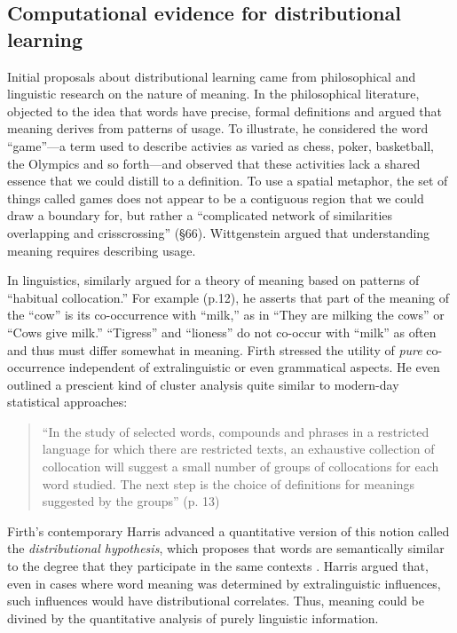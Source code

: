 \documentclass[man,longtable,floatsintext]{my-apa6}
\begin{document}
\subsection{Computational evidence for distributional learning}

Initial proposals about distributional learning came from philosophical and linguistic research on the nature of meaning. In the philosophical literature, \citet{wittgenstein1953} objected to the idea that words have precise, formal definitions and argued that meaning derives from patterns of usage. To illustrate, he considered the word ``game''---a term used to describe activies as varied as chess, poker, basketball, the Olympics and so forth---and observed that these activities lack a shared essence that we could distill to a definition. To use a spatial metaphor, the set of things called games does not appear to be a contiguous region that we could draw a boundary for, but rather a ``complicated network of similarities overlapping and crisscrossing'' (\S 66). Wittgenstein argued that understanding meaning requires describing usage.

In linguistics, \citet{firth1957} similarly argued for a theory of meaning based on patterns of ``habitual collocation.'' For example (p.12), he asserts that part of the meaning of the ``cow'' is its co-occurrence with  ``milk,'' as in ``They are milking the cows'' or ``Cows give milk.'' ``Tigress'' and ``lioness'' do not co-occur with ``milk'' as often and thus must differ somewhat in meaning. Firth stressed the utility of \emph{pure} co-occurrence independent of extralinguistic or even grammatical aspects. He even outlined a prescient kind of cluster analysis quite similar to modern-day statistical approaches:

\begin{quote}
``In the study of selected words, compounds and phrases in a restricted language for which there are restricted texts, an exhaustive collection of collocation will suggest a small number of groups of collocations for each word studied. The next step is the choice of definitions for meanings suggested by the groups'' (p. 13)
\end{quote}

Firth's contemporary Harris advanced a quantitative version of this notion called the \emph{distributional hypothesis}, which proposes that words are semantically similar to the degree that they participate in the same contexts \citep{harris1951}. Harris argued that, even in cases where word meaning was determined by extralinguistic influences, such influences would have distributional correlates. Thus, meaning could be divined by the quantitative analysis of purely linguistic information.
\end{document}
